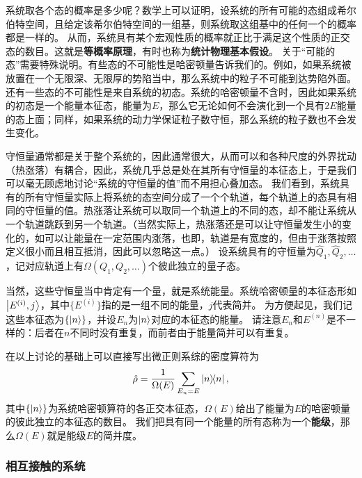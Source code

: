 \documentclass[hyperref, UTF8, a4paper]{ctexart}
\begin{document}
系统取各个态的概率是多少呢？数学上可以证明，设系统的所有可能的态组成希尔伯特空间，且给定该希尔伯特空间的一组基，则系统取这组基中的任何一个的概率都是一样的。
从而，系统具有某个宏观性质的概率就正比于满足这个性质的正交态的数目。这就是\textbf{等概率原理}，有时也称为\textbf{统计物理基本假设}。
关于“可能的态”需要特殊说明。有些态的不可能性是哈密顿量告诉我们的。例如，如果系统被放置在一个无限深、无限厚的势陷当中，那么系统中的粒子不可能到达势陷外面。还有一些态的不可能性是来自系统的初态。系统的哈密顿量不含时，因此如果系统的初态是一个能量本征态，能量为$E$，那么它无论如何不会演化到一个具有$2E$能量的态上面；同样，如果系统的动力学保证粒子数守恒，那么系统的粒子数也不会发生变化。

守恒量通常都是关于整个系统的，因此通常很大，从而可以和各种尺度的外界扰动（热涨落）有耦合，因此，系统几乎总是处在其所有守恒量的本征态上，于是我们可以毫无顾虑地讨论“系统的守恒量的值”而不用担心叠加态。
我们看到，系统具有的所有守恒量实际上将系统的态空间分成了一个个轨道，每个轨道上的态具有相同的守恒量的值。热涨落让系统可以取同一个轨道上的不同的态，却不能让系统从一个轨道跳跃到另一个轨道。（当然实际上，热涨落还是可以让守恒量发生小的变化的，如可以让能量在一定范围内涨落，也即，轨道是有宽度的，但由于涨落按照定义很小而且相互抵消，因此可以忽略这一点。）
设系统具有的守恒量为$\hat{Q}_1, \hat{Q}_2, \ldots$，记对应轨道上有$\Omega(Q_1, Q_2, \ldots)$个彼此独立的量子态。

当然，这些守恒量当中肯定有一个量，就是系统能量。系统哈密顿量的本征态形如$\ket{E^{(i)}, j}$，其中$\{E^{(i)}\}$指的是一组不同的能量，$j$代表简并。
为方便起见，我们记这些本征态为$\{\ket{n}\}$，并设$E_n$为$\ket{n}$对应的本征态的能量。
请注意$E_n$和$E^{(n)}$是不一样的：后者在$n$不同时没有重复，而前者由于能量简并可以有重复。

在以上讨论的基础上可以直接写出微正则系综的密度算符为
\begin{equation}
    \hat{\rho} = \frac{1}{\Omega(E)} \sum_{E_n = E} \dyad{n},
    \label{eq:microcanonical-ensemble-density-operator}
\end{equation}
其中$\{\ket{n}\}$为系统哈密顿算符的各正交本征态，$\Omega(E)$给出了能量为$E$的哈密顿量的彼此独立的本征态的数目。
我们把具有同一个能量的所有态称为一个\textbf{能级}，那么$\Omega(E)$就是能级$E$的简并度。

\subsubsection{相互接触的系统}\label{sec:contacting-systems}
\end{document}
